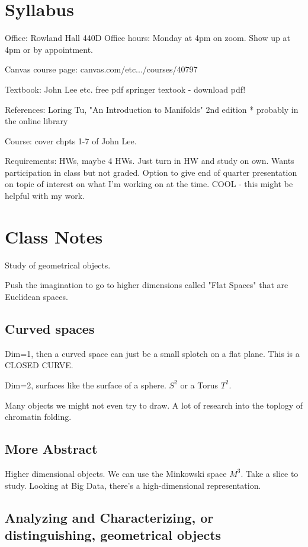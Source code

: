 \documentclass[12pt,letterpaper]{article}
\begin{document}
\section*{Syllabus}
Office: Rowland Hall 440D 
Office hours: Monday at 4pm on zoom. Show up at 4pm or by appointment.

Canvas course page: canvas.com/etc.../courses/40797

Textbook: John Lee etc. free pdf springer textook - download pdf!

References: Loring Tu, "An Introduction to Manifolds" 2nd edition
* probably in the online library

Course: cover chpts 1-7 of John Lee. 

Requirements: HWs, maybe 4 HWs. Just turn in HW and study on own. Wants participation in class but  not graded. Option to give end of quarter presentation on topic of interest on what I'm working on at the time. COOL - this might be helpful with my work. 




\section{Class Notes}

Study of geometrical objects. 

Push the imagination to go to higher dimensions called "Flat Spaces" that are Euclidean spaces.

\subsection{Curved  spaces}

Dim=1, then a curved space can just be a small splotch on a flat plane. This is a CLOSED CURVE. 

Dim=2, surfaces like the surface of a sphere. $S^2$ or a Torus $T^2$. 

Many objects we might not even try to draw. A lot of research into the toplogy of chromatin folding. 

\subsection{More Abstract}

Higher dimensional objects. We can use the Minkowski space $M^3$. Take a slice to study. Looking at Big Data, there's a high-dimensional representation. 

\subsection{Analyzing and Characterizing, or distinguishing, geometrical objects}
\end{document}
